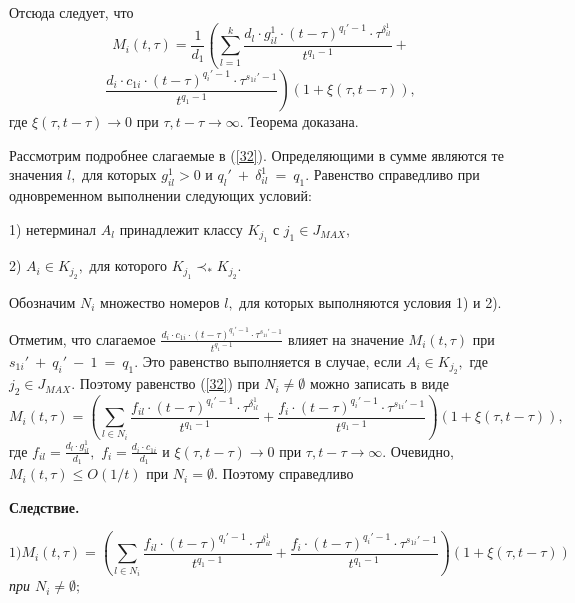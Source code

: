\documentclass[%
11pt,a4paper]{article}
\begin{document}
{{{Отсюда следует, что
\begin{equation}
M_i(t,\tau)=
 \frac{1}{d_1}\left(\sum_{l=1}^{k} \frac{d_l \cdot g_{il}^1 \cdot (t-\tau)^{q_l'-1}\cdot \tau^{\delta_{il}^1}}{t^{q_1-1}}+ \right.
\label{32}
\end{equation}
$$
\left.
 \frac {d_i \cdot c_{1i}\cdot(t-\tau)^{q_i'-1} \cdot \tau^{s_{1i}'-1} }{t^{q_1-1}}\right) \left(1+\xi(\tau,t-\tau)\right),
$$
где $\xi(\tau,t-\tau) \rightarrow 0$ при $\tau,t-\tau\rightarrow \infty.$ Теорема доказана.

\medskip

Рассмотрим подробнее слагаемые в (\ref{32}).
Определяющими в сумме являются те значения $l,$ для которых $g_{il}^1>0$ и $q_l'~+~\delta_{il}^1~=~q_1.$ Равенство справедливо при одновременном выполнении следующих условий:

1) нетерминал $A_l$ принадлежит классу $K_{j_1}$ с $j_1\in J_{MAX},$

2) $A_i \in K_{j_2},$ для которого $K_{j_1} \prec_* K_{j_2}.$

Обозначим $N_i$ множество номеров $l,$ для которых выполняются условия 1) и 2).

Отметим, что слагаемое $\frac {d_i \cdot c_{1i}\cdot(t-\tau)^{q_i'-1} \cdot \tau^{s_{1i}'-1} }{t^{q_1-1}} $ влияет на значение $M_i(t,\tau)$ при
$s_{1i}'~+~q_i'~-~1~=~q_1.$ Это равенство выполняется в случае, если $A_i \in K_{j_2},$ где $j_2\in J_{MAX}.$
Поэтому равенство (\ref{32}) при $N_i \ne \emptyset$ можно записать в виде
$$
M_i(t,\tau)=
 \left(\sum_{l \in N_i} \frac{f_{il} \cdot (t-\tau)^{q_l'-1}\cdot \tau^{\delta_{il}^1}}{t^{q_1-1}}+ \frac {f_i \cdot(t-\tau)^{q_i'-1} \cdot \tau^{s_{1i}'-1} }{t^{q_1-1}}\right) \left(1+\xi(\tau,t-\tau)\right),
$$
где $f_{il}=\frac{d_l \cdot g_{il}^1}{d_1},$ $f_{i}=\frac {d_i \cdot c_{1i}}{d_1}$ и $\xi(\tau,t-\tau) \rightarrow 0$ при $\tau,t-\tau\rightarrow \infty.$
Очевидно, $M_i(t,\tau)\le O(1/t)$ при $N_i = \emptyset.$
Поэтому справедливо

\medskip
\textbf{Следствие.}
{\em
$$
1) M_i(t,\tau)=
 \left(\sum_{l \in N_i} \frac{f_{il} \cdot (t-\tau)^{q_l'-1}\cdot \tau^{\delta_{il}^1}}{t^{q_1-1}}+ \frac {f_i \cdot(t-\tau)^{q_i'-1} \cdot \tau^{s_{1i}'-1} }{t^{q_1-1}}\right) \left(1+\xi(\tau,t-\tau)\right)
$$
при $N_i \ne \emptyset;$

}}}}
\end{document}
